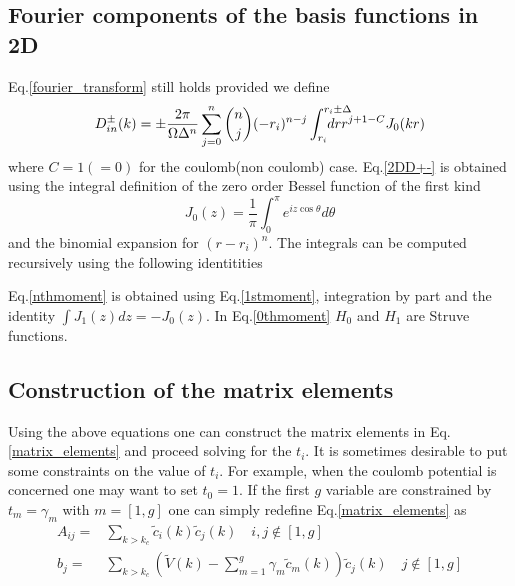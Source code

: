 \documentclass{revtex4}
\newcommand{\tV}{\widetilde{V}}
\newcommand{\tc}{\widetilde{c}}
\begin{document}
\subsection*{Fourier components of the basis functions in 2D}
Eq.\ref{fourier_transform} still holds provided we define  
\begin{equation}
D^\pm_{in}(k)=\pm\frac{2\pi}{\Omega \Delta^n} \sum_{j=0}^n \binom{n}{j}
(-r_i)^{n-j}\int_{r_i}^{r_i\pm \Delta}\negthickspace \negthickspace 
\negthickspace \negthickspace \negthickspace \negthickspace \negthickspace 
dr r^{j+1-C} J_0(kr)
\label{2DD+-}
\end{equation}
where $C=1(=0)$ for the coulomb(non coulomb) case.
Eq.\ref{2DD+-} is obtained using the integral definition of the 
zero order Bessel function of the first kind 
\begin{equation}
J_0(z)=\frac{1}{\pi}\int_0^\pi e^{iz\cos\theta}d\theta
\end{equation}
and the binomial expansion for $(r-r_i)^n$.
The integrals can be computed recursively using the following identitities
\begin{center}
\end{center}
Eq.\ref{nthmoment} is obtained using Eq.\ref{1stmoment}, integration by part and 
the identity $\int J_1(z) dz =-J_0(z)$. In Eq.\ref{0thmoment} $H_0$ and $H_1$ are Struve functions.

\subsection{Construction of the matrix elements}
Using the above equations one can construct the matrix elements in Eq.\ref{matrix_elements}
and proceed solving for the $t_i$. It is sometimes desirable to put some constraints
on the value of $t_i$. For example, when the coulomb potential is concerned one may 
want to set $t_{0}=1$. If the first $g$ variable are constrained by $t_{m}=\gamma_m$ 
with $m=[1,g]$ one can simply redefine Eq.\ref{matrix_elements} as
\begin{equation}
\begin{split}
A_{ij}=&\sum_{k>k_c} \tc_i(k)\tc_j(k)  \quad i,j\notin[1,g] \\
b_j=&\sum_{k>k_c} \left(\tV(k)-\sum_{m=1}^g \gamma_m \tc_m(k)\right)\tc_j(k)\quad j\notin[1,g]
\end{split}
\label{modified_matrix_elements}
\end{equation}
\end{document}
